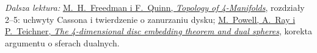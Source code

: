 \par\smallskip
{\footnotesize\noindent\emph{Dalsza lektura:}
\href{https://archive.mpim-bonn.mpg.de/4789/2/FreedmanQuinn-TopologyOf4Manifolds-Reformatted2013.pdf}
{M.\ H.\ Freedman i F.\ Quinn, \emph{Topology of 4-Manifolds}},
rozdziały 2--5: uchwyty Cassona i twierdzenie o zanurzaniu dysku;
\href{https://arxiv.org/pdf/2006.05209}
{M.\ Powell, A.\ Ray i P.\ Teichner, \emph{The 4-dimensional
disc embedding theorem and dual spheres}}, korekta argumentu
o sferach dualnych.\par}
